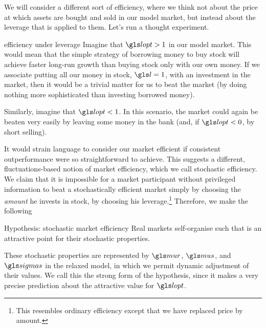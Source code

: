 We will consider a different sort of efficiency, where we think not about the price at which assets are bought and sold in our model market, but instead about the leverage that is applied to them. Let's run a thought experiment.

\begin{thoughtex}{efficiency under leverage}
Imagine that $\lopt>1$ in our model market. This would mean that the simple strategy of borrowing money to buy stock will achieve faster long-run growth than buying stock only with our own money. If we associate putting all our money in stock, $\l=1$, with an investment in the market, then it would be a trivial matter for us to beat the market (by doing nothing more sophisticated than investing borrowed money).

Similarly, imagine that $\lopt<1$. In this scenario, the market could again be beaten very easily by leaving some money in the bank (and, if $\lopt<0$, by short selling).
\end{thoughtex}

It would strain language to consider our market efficient if consistent outperformance were so straightforward to achieve. This suggests a different, fluctuations-based notion of market efficiency, which we call stochastic efficiency. We claim that it is impossible for a market participant without privileged information to beat a stochastically efficient market simply by choosing the \textit{amount} he invests in stock, \ie by choosing his leverage.\footnote{This resembles ordinary efficiency except that we have replaced price by amount.} Therefore, we make the following

\begin{keypts}{Hypothesis: stochastic market efficiency}
Real markets self-organise such that
\be
{}
\ee
is an attractive point for their stochastic properties.
\end{keypts}

These stochastic properties are represented by $\mur$, $\mus$, and $\sigmas$ in the relaxed model, in which we permit dynamic adjustment of their values. We call this the strong form of the hypothesis, since it makes a very precise prediction about the attractive value for $\lopt$.

